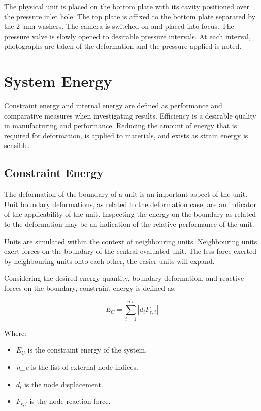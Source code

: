 The physical unit is placed on the bottom plate with its cavity positioned over the pressure inlet hole. The top plate is affixed to the bottom plate separated by the \SI{2}{mm} washers. The camera is switched on and placed into focus. The pressure valve is slowly opened to desirable pressure intervals. At each interval, photographs are taken of the deformation and the pressure applied is noted.

\section{System Energy}
\label{sec:SE}

Constraint energy and internal energy are defined as performance and comparative measures when investigating results. Efficiency is a desirable quality in manufacturing and performance. Reducing the amount of energy that is required for deformation, is applied to materials, and exists as strain energy is sensible.

\subsection{Constraint Energy}

The deformation of the boundary of a unit is an important aspect of the unit. Unit boundary deformations, as related to the deformation case, are an indicator of the applicability of the unit. Inspecting the energy on the boundary as related to the deformation may be an indication of the relative performance of the unit.

Units are simulated within the context of neighbouring units. Neighbouring units exert forces on the boundary of the central evaluated unit. The less force exerted by neighbouring units onto each other, the easier units will expand.

Considering the desired energy quantity, boundary deformation, and reactive forces on the boundary, constraint energy is defined as:

\begin{equation}
	E_{C}=\sum_{i=1}^{n\_e}\left | d_{i}F_{r,i} \right |
\end{equation}

Where:

\begin{itemize}
	\item $E_{C}$ is the constraint energy of the system.
	\item \textit{n\_e} is the list of external node indices.
	\item $d_{i}$ is the node displacement.
	\item $F_{r,i}$ is the node reaction force.
\end{itemize}

